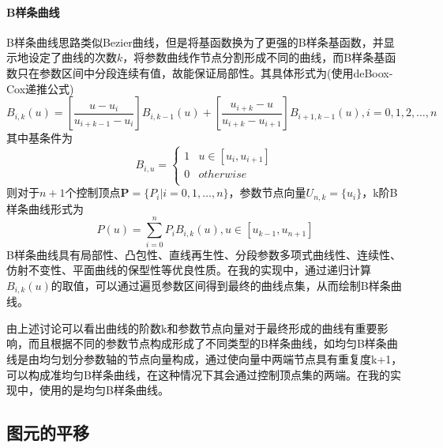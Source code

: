 \documentclass[a4paper,UTF8]{article}
\theoremstyle{definition}
\begin{document}
\paragraph{B样条曲线}
B样条曲线思路类似Bezier曲线，但是将基函数换为了更强的B样条基函数，并显示地设定了曲线的次数$k$，将参数曲线作节点分割形成不同的曲线，而B样条基函数只在参数区间中分段连续有值，故能保证局部性。其具体形式为(使用deBoox-Cox递推公式)\cite{graphTextBook}
\begin{equation}
B_{i,k}(u)=[\frac{u-u_i}{u_{i+k-1}-u_i}]B_{i,k-1}(u)+
[\frac{u_{i+k}-u}{u_{i+k}-u_{i+1}}]B_{i+1,k-1}(u), i=0,1,2,\ldots,n
\end{equation}
其中基条件为
\begin{equation}
B_{i,u}=\left\{
\begin{array}{ll}
1 & u\in[u_{i},u_{i+1}] \\
0 & otherwise \\
\end{array}
\right.
\end{equation}
则对于$n+1$个控制顶点$\mathbf{P}=\{P_i|i=0,1,\ldots,n\}$，参数节点向量$U_{n,k}=\{u_i\}$，k阶B样条曲线形式为
\begin{equation}
P(u)=\sum_{i=0}^{n}P_iB_{i,k}(u), u\in[u_{k-1},u_{n+1}]
\end{equation}
B样条曲线具有局部性、凸包性、直线再生性、分段参数多项式曲线性、连续性、仿射不变性、平面曲线的保型性等优良性质。在我的实现中，通过递归计算$B_{i,k}(u)$的取值，可以通过遍觅参数区间得到最终的曲线点集，从而绘制B样条曲线。
\par 由上述讨论可以看出曲线的阶数k和参数节点向量对于最终形成的曲线有重要影响，而且根据不同的参数节点构成形成了不同类型的B样条曲线，如均匀B样条曲线是由均匀划分参数轴的节点向量构成，通过使向量中两端节点具有重复度k+1，可以构成准均匀B样条曲线，在这种情况下其会通过控制顶点集的两端。在我的实现中，使用的是均匀B样条曲线。
\subsection{图元的平移}
\end{document}
